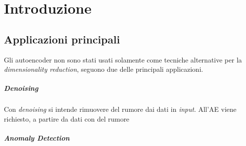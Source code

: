 
\chapter{Introduzione}

%
%
%
%






\clearpage
\section{Applicazioni principali}
Gli autoencoder non sono stati usati solamente come tecniche alternative per la \textit{dimensionality reduction}, seguono due delle principali applicazioni.

\paragraph{Denoising}
Con \textit{denoising} si intende rimuovere del rumore dai dati in \textit{input}.
All'AE viene richiesto, a partire da dati con del rumore



\paragraph{Anomaly Detection}


\clearpage

\clearpage
